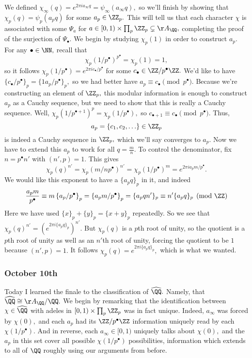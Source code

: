 We defined $\chi_\infty(q)=e^{2\pi ia_\infty q}=\psi_\infty(a_\infty q),$ so we'll finish by showing that $\chi_p(q)=\psi_p(a_pq)$ for some $a_p\in\ZZ_p.$ This will tell us that each character $\chi$ is associated with some $\Psi_a$ for $a\in[0,1)\times\prod_p\ZZ_p\subsetneq\AA_\QQ,$ completing the proof of the surjection of $\Psi_\bullet.$ We begin by studying $\chi_p(1)$ in order to construct $a_p.$ For any $\bullet\in\NN,$ recall that
\[\chi_p\left(1/p^\bullet\right)^{p^\bullet}=\chi_p(1)=1,\]
so it follows $\chi_p\left(1/p^\bullet\right)=e^{2\pi ic_\bullet/p^\bullet}$ for some $c_\bullet\in\ZZ/p^\bullet\ZZ.$ We'd like to have $\{c_\bullet/p^\bullet\}_p=\{1a_p/p^\bullet\}_p,$ so we had better have $a_p\equiv c_\bullet\pmod{p^\bullet}.$ Because we're constructing an element of $\ZZ_p,$ this modular information is enough to construct $a_p$ as a Cauchy sequence, but we need to show that this is really a Cauchy sequence. Well, $\chi_p\left(1/p^{\bullet+1}\right)^p=\chi_p\left(1/p^\bullet\right),$ so $c_{\bullet+1}\equiv c_\bullet\pmod{p^\bullet}.$ Thus,
\[a_p=\{c_1,c_2,\ldots\}\in\ZZ_p\]
is indeed a Cauchy sequence in $\ZZ_p,$ which we'll say converges to $a_p.$ Now we have to extend this $a_p$ to work for all $q=\frac mn.$ To control the denominator, fix $n=p^\bullet n'$ with $(n',p)=1.$ This gives
\[\chi_p(q)^{n'}=\chi_p\left(m/np^\bullet\right)^{n'}=\chi_p\left(1/p^\bullet\right)^m=e^{2\pi ia_pm/p^\bullet}.\]
We would like this exponent to have a $\{a_pq\}_p$ in it, and indeed
\[\frac{a_pm}{p^\bullet}\equiv m\left\{a_p/p^\bullet\right\}_p=\left\{a_pm/p^\bullet\right\}_p=\{a_pqn'\}_p\equiv n'\{a_pq\}_p\pmod\ZZ\]
Here we have used $\{x\}_p+\{y\}_p=\{x+y\}_p$ repeatedly. So we see that $\chi_p(q)^{n'}=\left(e^{2\pi i\{a_pq\}_p}\right)^{n'}.$ But $\chi_p(q)$ is a $p$th root of unity, so the quotient is a $p$th root of unity as well as an $n'$th root of unity, forcing the quotient to be $1$ because $(n',p)=1.$ It follows $\chi_p(q)=e^{2\pi i\{a_pq\}_p},$ which is what we wanted.

\subsubsection{October 10th}
Today I learned the finale to the classification of $\widehat\QQ.$ Namely, that $\widehat\QQ\cong\AA_\QQ/\QQ.$ We begin by remarking that the identification between $\chi\in\widehat\QQ$ with adeles in $[0,1)\times\prod_p\ZZ_p$ was in fact unique. Indeed, $a_\infty$ was forced by $\chi(0),$ and each $a_p$ had its $\ZZ/p^\bullet\ZZ$ information uniquely read by each $\chi(1/p^\bullet).$ And in reverse, each $a_\infty\in[0,1)$ uniquely talks about $\chi(0),$ and the $a_p$ in this set cover all possible $\chi(1/p^\bullet)$ possibilities, information which extends to all of $\QQ$ roughly using our arguments from before.

